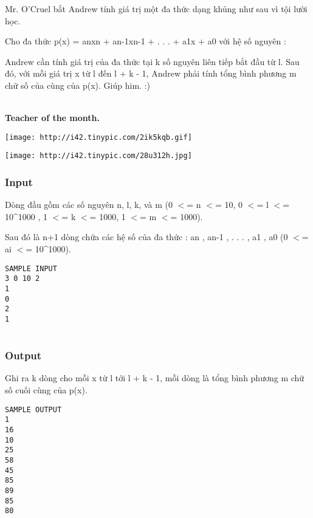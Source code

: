

Mr. O'Cruel bắt Andrew tính giá trị một đa thức dạng khủng như sau vì tội lười học.

Cho đa thức p(x) = anxn + an-1xn-1 + . . . + a1x + a0 với hệ số nguyên :

Andrew cần tính giá trị của đa thức tại k số nguyên liên tiếp bắt đầu từ l. Sau đó, với mỗi giá trị x từ l đến l + k - 1, Andrew phải tính tổng bình phương m chữ số của cùng của p(x). Giúp him. :)


\\\textbf{Teacher of the month. }


\texttt{[image: http://i42.tinypic.com/2ik5kqb.gif]}


\texttt{[image: http://i42.tinypic.com/28u312h.jpg]}

\subsubsection{Input}

Dòng đầu gồm các số nguyên n, l, k, và m (0 $<$= n $<$= 10, 0 $<$= l $<$= 10\textasciicircum1000 , 1 $<$= k $<$= 1000, 1 $<$= m $<$= 1000).

Sau đó là n+1 dòng chứa các hệ số của đa thức : an , an-1 , . . . , a1 , a0 (0 $<$= ai $<$= 10\textasciicircum1000).
\begin{verbatim}
SAMPLE INPUT
3 0 10 2
1
0
2
1


\end{verbatim}

\subsubsection{Output}

Ghi ra k dòng cho mỗi x từ l tới l + k - 1, mỗi dòng là tổng bình phương m chữ số cuối cùng của p(x).
\begin{verbatim}
SAMPLE OUTPUT
1
16
10
25
58
45
85
89
85
80
\end{verbatim}

 